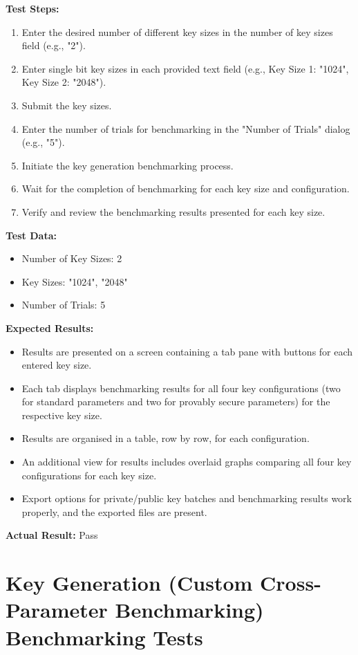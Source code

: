 \documentclass[]{final_report}
\theoremstyle{definition}
\begin{document}
\textbf{Test Steps:}
\begin{enumerate}
    \item Enter the desired number of different key sizes in the number of key sizes field (e.g., "2").
    \item Enter single bit key sizes in each provided text field (e.g., Key Size 1: "1024", Key Size 2: "2048").
    \item Submit the key sizes.
    \item Enter the number of trials for benchmarking in the "Number of Trials" dialog (e.g., "5").
    \item Initiate the key generation benchmarking process.
    \item Wait for the completion of benchmarking for each key size and configuration.
    \item Verify and review the benchmarking results presented for each key size.
\end{enumerate}

\textbf{Test Data:}
\begin{itemize}
    \item Number of Key Sizes: 2
    \item Key Sizes: "1024", "2048"
    \item Number of Trials: 5
\end{itemize}

\textbf{Expected Results:}
\begin{itemize}
    \item Results are presented on a screen containing a tab pane with buttons for each entered key size.
    \item Each tab displays benchmarking results for all four key configurations (two for standard parameters and two for provably secure parameters) for the respective key size.
    \item Results are organised in a table, row by row, for each configuration.
    \item An additional view for results includes overlaid graphs comparing all four key configurations for each key size.
    \item Export options for private/public key batches and benchmarking results work properly, and the exported files are present.
\end{itemize}

\textbf{Actual Result:} Pass


\section*{Key Generation (Custom Cross-Parameter Benchmarking) Benchmarking Tests}
\end{document}
